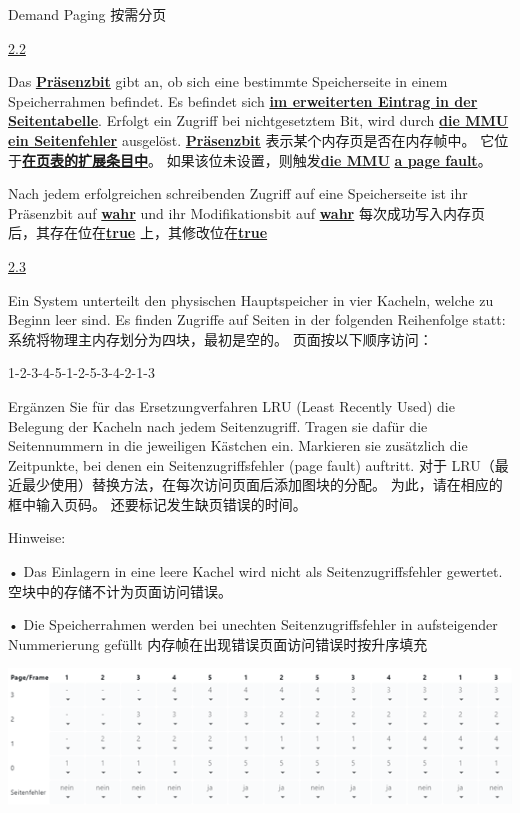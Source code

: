 \documentclass[fleqn]{article}
\begin{document}
Demand Paging 按需分页

\noindent\uline{2.2}

Das \uline{\textbf{Präsenzbit}} gibt an, ob sich eine bestimmte Speicherseite in einem Speicherrahmen befindet. Es befindet sich \uline{\textbf{im erweiterten Eintrag in der Seitentabelle}}. Erfolgt ein Zugriff bei nichtgesetztem Bit, wird durch \uline{\textbf{die MMU}} \uline{\textbf{ein Seitenfehler}} ausgelöst.
\uline{\textbf{Präsenzbit}} 表示某个内存页是否在内存帧中。 它位于\uline{\textbf{在页表的扩展条目中}}。 如果该位未设置，则触发\uline{\textbf{die MMU}} \uline{\textbf{a page fault}}。

Nach jedem erfolgreichen schreibenden Zugriff auf eine Speicherseite ist ihr Präsenzbit auf \uline{\textbf{wahr}} und ihr Modifikationsbit auf \uline{\textbf{wahr}} 
每次成功写入内存页后，其存在位在\uline{\textbf{true}} 上，其修改位在\uline{\textbf{true}}

\noindent\uline{2.3}

Ein System unterteilt den physischen Hauptspeicher in vier Kacheln, welche zu Beginn leer sind. Es finden Zugriffe auf Seiten in der folgenden Reihenfolge statt:
系统将物理主内存划分为四块，最初是空的。 页面按以下顺序访问：

1-2-3-4-5-1-2-5-3-4-2-1-3

Ergänzen Sie für das Ersetzungverfahren LRU (Least Recently Used) die Belegung der Kacheln nach jedem Seitenzugriff. Tragen sie dafür die Seitennummern in die jeweiligen Kästchen ein. Markieren sie zusätzlich die Zeitpunkte, bei denen ein Seitenzugriffsfehler (page fault) auftritt.
对于 LRU（最近最少使用）替换方法，在每次访问页面后添加图块的分配。 为此，请在相应的框中输入页码。 还要标记发生缺页错误的时间。

Hinweise:

•	Das Einlagern in eine leere Kachel wird nicht als Seitenzugriffsfehler gewertet.
空块中的存储不计为页面访问错误。

•	Die Speicherrahmen werden bei unechten Seitenzugriffsfehler in aufsteigender Nummerierung gefüllt
内存帧在出现错误页面访问错误时按升序填充

\begin{center}
    \includegraphics{25.png}
\end{center}
\end{document}
